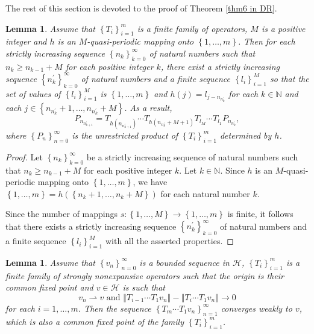 \documentclass[]{interact}
\theoremstyle{plain}%
\newtheorem{lemma}[theorem]{Lemma}
\theoremstyle{definition}
\theoremstyle{remark}
\begin{document}
The rest of this section is devoted to the proof of Theorem \ref{thm6 in DR}.
\begin{lemma}
\label{Lem 3}Assume that $\left\{ T_{i}\right\} _{i=1}^{m}$ is a
finite family of operators, $M$ is a positive integer and $h$ is
an $M$-quasi-periodic mapping onto $\left\{ 1,\dots,m\right\} $.
Then for each strictly increasing sequence $\left\{ n_{k}\right\} _{k=0}^{\infty}$
of natural numbers such that $n_{k}\ge n_{k-1}+M$ for each positive
integer $k$, there exist a strictly increasing sequence $\left\{ n_{k}^{\prime}\right\} _{k=0}^{\infty}$
of natural numbers and a finite sequence $\left\{ l_{i}\right\} _{i=1}^{M}$
so that the set of values of $\left\{ l_{i}\right\} _{i=1}^{M}$ is
$\left\{ 1,\dots,m\right\} $ and $h\left(j\right)=l_{j-n_{n_{k}^{\prime}}}$
for each $k\in\mathbb{N}$ and each $j\in\left\{ n_{n_{k}^{\prime}}+1,\dots,n_{n_{k}^{\prime}}+M\right\} $.
As a result,
\[
P_{n_{n_{k+1}^{\prime}}}=T_{h\left(n_{n_{k+1}^{\prime}}\right)}\cdots T_{h\left(n_{n_{k}^{\prime}}+M+1\right)}T_{l_{M}}\cdots T_{l_{1}}P_{n_{n_{k}^{\prime}}},
\]
where $\left\{ P_{n}\right\} _{n=0}^{\infty}$ is the \color{black}unrestricted \color{black} product
of $\left\{ T_{i}\right\} _{i=1}^{m}$ determined by $h$.
\end{lemma}
\begin{proof}
Let $\left\{ n_{k}\right\} _{k=0}^{\infty}$ be a strictly increasing
sequence of natural numbers such that $n_{k}\ge n_{k-1}+M$ for
each positive integer $k$. Let $k\in\mathbb{N}$. Since $h$ is an $M$-quasi-periodic
mapping onto $\left\{ 1,\dots,m\right\} $, we have
$\left\{ 1,\dots,m\right\} =h\left(\left\{ n_{k}+1,\dots,n_{k}+M\right\} \right)$ for each natural number $k$.

Since the number of mappings $s:\left\{ 1,\dots,M\right\} \rightarrow\left\{ 1,\dots,m\right\} $
is finite, it follows that there exists a strictly increasing sequence
$\left\{ n_{k}^{\prime}\right\} _{k=0}^{\infty}$ of natural numbers
and a finite sequence $\left\{ l_{i}\right\} _{i=1}^{M}$ with all
the asserted properties.
\end{proof}
\begin{lemma}
\label{Lem 4}Assume that $\left\{ v_{n}\right\} _{n=0}^{\infty}$
is a bounded sequence in $\mathcal{H}$, $\left\{ T_{i}\right\} _{i=1}^{m}$
is a finite family of strongly nonexpansive operators such that the
origin is their common fixed point and $v\in\mathcal{H}$ is such that
\begin{equation}
v_{n}\rightharpoonup v\,\,\mathrm{and}\,\,\left\Vert T_{i-1}\cdots T_{1}v_{n}\right\Vert -\left\Vert T_{i}\cdots T_{1}v_{n}\right\Vert \rightarrow0\label{eq:-9}
\end{equation}
for each $i=1,\dots,m$. Then the sequence $\left\{ T_{m}\cdots T_{1}v_{n}\right\} _{n=1}^{\infty}$
converges weakly to $v$, which is also a common fixed point of the
family $\left\{ T_{i}\right\} _{i=1}^{m}$.
\end{lemma}
\end{document}
